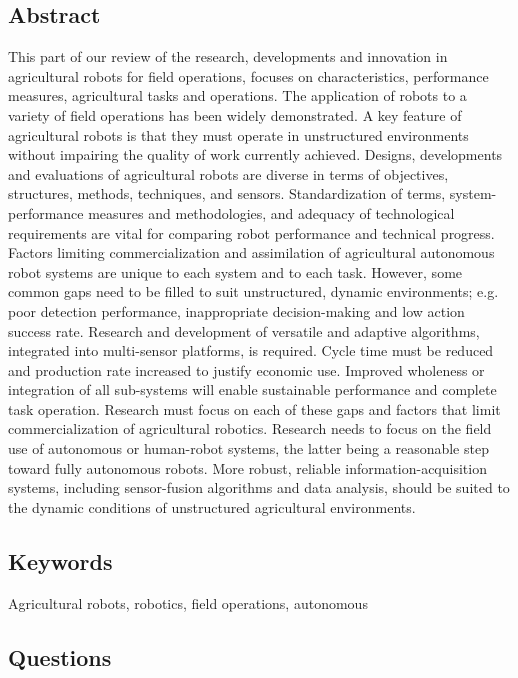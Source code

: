     \subsection*{Abstract}
    This part of our review of the research, developments and innovation in agricultural robots
    for field operations, focuses on characteristics, performance measures, agricultural tasks and
    operations. The application of robots to a variety of field operations has been widely
    demonstrated. A key feature of agricultural robots is that they must operate in unstructured
    environments without impairing the quality of work currently achieved. Designs, developments and evaluations of agricultural robots are diverse in terms of objectives, structures, methods, techniques, and sensors. Standardization of terms, system-performance
    measures and methodologies, and adequacy of technological requirements are vital for
    comparing robot performance and technical progress. Factors limiting commercialization
    and assimilation of agricultural autonomous robot systems are unique to each system and to
    each task. However, some common gaps need to be filled to suit unstructured, dynamic environments; e.g. poor detection performance, inappropriate decision-making and low action
    success rate. Research and development of versatile and adaptive algorithms, integrated into
    multi-sensor platforms, is required. Cycle time must be reduced and production rate
    increased to justify economic use. Improved wholeness or integration of all sub-systems will
    enable sustainable performance and complete task operation. Research must focus on each
    of these gaps and factors that limit commercialization of agricultural robotics. Research
    needs to focus on the field use of autonomous or human-robot systems, the latter being a
    reasonable step toward fully autonomous robots. More robust, reliable information-acquisition systems, including sensor-fusion algorithms and data analysis, should be
    suited to the dynamic conditions of unstructured agricultural environments.


    \subsection*{Keywords}
    Agricultural robots, robotics, field operations, autonomous
    
    \subsection*{Questions}
